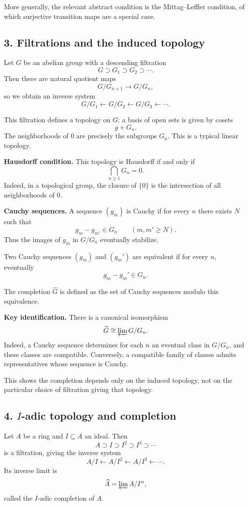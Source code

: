 \documentclass[12pt,a4paper]{article}
\theoremstyle{plain}
\theoremstyle{definition}      %
\begin{document}
More generally, the relevant abstract condition is the Mittag--Leffler condition, of which surjective transition maps are a special case.

\subsection*{3. Filtrations and the induced topology}

Let \(G\) be an abelian group with a descending filtration
\[
G\supset G_1\supset G_2\supset \cdots.
\]
Then there are natural quotient maps
\[
G/G_{n+1}\to G/G_n,
\]
so we obtain an inverse system
\[
G/G_1 \xleftarrow{} G/G_2 \xleftarrow{} G/G_3 \xleftarrow{}\cdots.
\]

This filtration defines a topology on \(G\): a basis of open sets is given by cosets
\[
g+G_n.
\]
The neighborhoods of \(0\) are precisely the subgroups \(G_n\). This is a typical linear topology.

\medskip
\textbf{Hausdorff condition.}
This topology is Hausdorff if and only if
\[
\bigcap_{n\ge1} G_n = 0.
\]
Indeed, in a topological group, the closure of \(\{0\}\) is the intersection of all neighborhoods of \(0\).

\medskip
\textbf{Cauchy sequences.}
A sequence \((g_m)\) is Cauchy if for every \(n\) there exists \(N\) such that
\[
g_m-g_{m'}\in G_n
\qquad (m,m'\ge N).
\]
Thus the images of \(g_m\) in \(G/G_n\) eventually stabilize.

Two Cauchy sequences \((g_m)\) and \((g_m')\) are equivalent if for every \(n\), eventually
\[
g_m-g_m'\in G_n.
\]

The completion \(\widehat G\) is defined as the set of Cauchy sequences modulo this equivalence.

\medskip
\textbf{Key identification.}
There is a canonical isomorphism
\[
\widehat G \cong \varprojlim G/G_n.
\]
Indeed, a Cauchy sequence determines for each \(n\) an eventual class in \(G/G_n\), and these classes are compatible. Conversely, a compatible family of classes admits representatives whose sequence is Cauchy.

This shows the completion depends only on the induced topology, not on the particular choice of filtration giving that topology.

\subsection*{4. \(I\)-adic topology and completion}

Let \(A\) be a ring and \(I\subseteq A\) an ideal. Then
\[
A\supset I\supset I^2\supset I^3\supset \cdots
\]
is a filtration, giving the inverse system
\[
A/I \xleftarrow{} A/I^2 \xleftarrow{} A/I^3 \xleftarrow{}\cdots.
\]
Its inverse limit is
\[
\widehat A=\varprojlim A/I^n,
\]
called the \(I\)-adic completion of \(A\).
\end{document}
